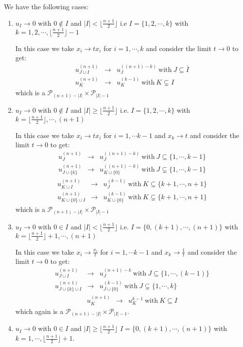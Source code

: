 \documentclass[hidelinks,12pt]{article}
\newcommand{\bea}[1]{\begin{eqnarray}\label{#1} }
\newcommand{\eea}{\end{eqnarray}}
\def\bea{\begin{eqnarray}}
\def\eea{\end{eqnarray}}
\begin{document}
We have the following cases:
\begin{enumerate}
    \item $u_I \rightarrow 0$ with $0\notin I$ and $|I| < \lfloor \frac{n+1}{2} \rfloor$ i.e $I =  \{1,2,\cdots, k \}$ with $k= 1,2,\cdots, \lfloor \frac{n+1}{2} \rfloor -1$
    
    In this case we take $x_i \rightarrow t x_i$ for $i=1,\cdots, k $ and consider the limit $t \rightarrow 0$ to get:
    \bea
    u^{(n+1)}_{J \cup  I} &\rightarrow& u_{J}^{((n+1)-k )} ~\text{with}~ J\subseteq\bar{I}\\
     u^{(n+1)}_{K} &\rightarrow& u_{K}^{(k-1)} ~\text{with}~ K\subsetneq I
    \eea
   which is a $\mathscr P_{(n+1)-|I|} \times \mathscr P_{|I|-1}$ 
    
    
    \item $u_I \rightarrow 0$ with $0\notin I$ and $|I| \ge \lfloor \frac{n+1}{2} \rfloor$ i.e. $I = \{1,2,\cdots,k \}$ with $k= \lfloor \frac{n+1}{2} \rfloor,\cdots,(n+1)$
    
     In this case we take $x_i \rightarrow t x_i$ for $i=1,\cdots k-1$ and $x_{k} \rightarrow t$ and  consider the limit $t \rightarrow 0$ to get:
    \bea
    u^{(n+1)}_{J } &\rightarrow& u_{J}^{((n+1)-k)} ~\text{with}~ J\subseteq \{1,\cdots,k-1\}\\
     u^{(n+1)}_{J \cup \{k\}} &\rightarrow& u_{K \cup\{0\}}^{((n+1)-k)} ~\text{with}~ J\subsetneq \{1,\cdots,k-1\}
    \eea
     \bea
    u^{(n+1)}_{K \cup I } &\rightarrow& u_{J}^{(k-1)} ~\text{with}~ K\subseteq \{k +1,\cdots,n+1\}\\
     u^{(n+1)}_{K \cup \{0\}\cup I} &\rightarrow& u_{K \cup\{0\}}^{(k-1)} ~\text{with}~ K\subsetneq \{k +1,\cdots,n+1\}
    \eea
   which is a $\mathscr P_{(n+1)-|I|} \times \mathscr P_{|I|-1}$ 
    \item $u_I \rightarrow 0$ with $0\in I$ and $|I| < \lfloor \frac{n+1}{2} \rfloor$ i.e. $I = \{0,(k+1),\cdots,(n+1)\}$ with $k= \lfloor \frac{n+1}{2} \rfloor+1,\cdots,(n+1)$
    
    In this case we take $x_i \rightarrow \frac{ x_i}{t}$ for $i=1,\cdots k-1$ and $x_{k} \rightarrow \frac{1}{t}$ and  consider the limit $t \rightarrow 0$ to get:
    \bea
    u^{(n+1)}_{J \cup I } &\rightarrow& u_{J}^{(n+1)-k} ~\text{with}~ J\subseteq \{1,\cdots,(k-1)\}\\
     u^{(n+1)}_{J \cup \{k\}\cup I} &\rightarrow& u_{J \cup\{0\}}^{(k-1)} ~\text{with}~ J\subsetneq \{1 ,\cdots, k\}
    \eea
     \bea
    u^{(n+1)}_{K} &\rightarrow& u_{K}^{k-1} ~\text{with}~ K\subseteq I
    \eea
    which again is a $\mathscr P_{(n+1)-|I|} \times \mathscr P_{|I|-1}$. 
    \item $u_I \rightarrow 0$ with $0\in I$ and $|I| \ge \lfloor \frac{n+1}{2} \rfloor$ $I = \{0,(k+1),\cdots,(n+1)\}$ with $k= 1,\cdots, \lfloor \frac{n+1}{2} \rfloor+1$.
    

\end{enumerate}
\end{document}
